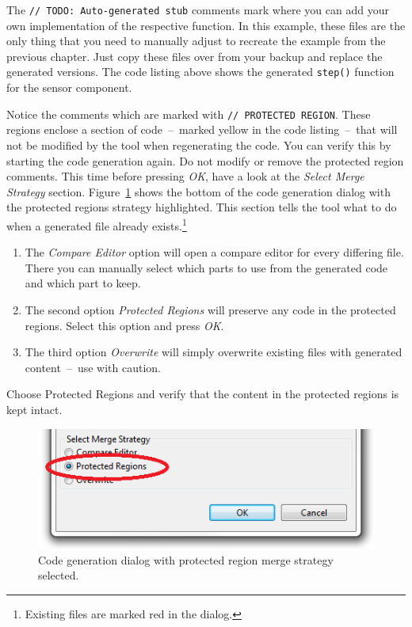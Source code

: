 The \lstinline|// TODO: Auto-generated stub| comments mark where you can add your own implementation of the respective function.
%
In this example, these files are the only thing that you need to manually adjust to recreate the example from the previous chapter.
Just copy these files over from your backup and replace the generated versions.
The code listing above shows the generated \verb|step()| function for the sensor component.

Notice the comments which are marked with \lstinline|// PROTECTED REGION|.
These regions enclose a section of code~--~marked yellow in the code listing~--~that will not be modified by the tool when regenerating the code.
You can verify this by starting the code generation again. Do not modify or remove the protected region comments.
This time before pressing \emph{OK}, have a look at the \emph{Select Merge Strategy} section.
Figure~\ref{fig:xmt_manifest_protected_regions.png} shows the bottom of the code generation dialog with the protected regions strategy highlighted.
This section tells the tool what to do when a generated file already exists.\footnote{%
	Existing files are marked red in the dialog.
}
\begin{enumerate}
	\item The \emph{Compare Editor} option will open a compare editor for every differing file.
		There you can manually select which parts to use from the generated code and which part to keep.

	\item The second option \emph{Protected Regions} will preserve any code in the protected regions.
		Select this option and press \emph{OK}.
	
	\item The third option \emph{Overwrite} will simply overwrite existing files with generated content~--~use with caution.
\end{enumerate}
%
Choose Protected Regions and verify that the content in the protected regions is kept intact.

\begin{figure}[htpb]
	\centering
	\includegraphics[scale=0.50]{figures/xmt_manifest_protected_regions.png}
	\caption{Code generation dialog with protected region merge strategy selected.}
	\label{fig:xmt_manifest_protected_regions.png}
\end{figure}

